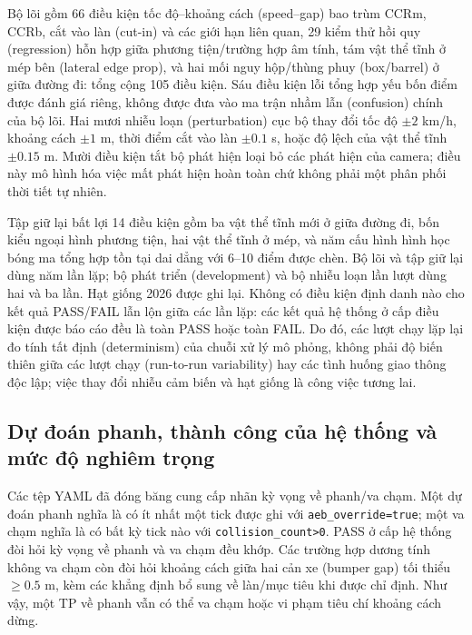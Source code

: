 \documentclass[11pt,a4paper]{article}
\begin{document}
Bộ lõi gồm 66 điều kiện tốc độ--khoảng cách (speed--gap) bao trùm CCRm, CCRb,
cắt vào làn (cut-in) và các giới hạn liên quan, 29 kiểm thử hồi quy
(regression) hỗn hợp giữa phương tiện/trường hợp âm tính, tám vật thể tĩnh ở
mép bên (lateral edge prop), và hai mối nguy hộp/thùng phuy (box/barrel) ở
giữa đường đi: tổng cộng 105 điều kiện. Sáu điều kiện lỗi tổng hợp yếu bốn
điểm được đánh giá riêng, không được đưa vào ma trận nhầm lẫn (confusion)
chính của bộ lõi. Hai mươi nhiễu loạn (perturbation) cục bộ thay đổi tốc độ $\pm2$ km/h,
khoảng cách $\pm1$ m, thời điểm cắt vào làn $\pm0.1$ s, hoặc độ lệch của vật
thể tĩnh $\pm0.15$ m. Mười điều kiện tắt bộ phát hiện loại bỏ các phát hiện
của camera; điều này mô hình hóa việc mất phát hiện hoàn toàn chứ không phải
một phân phối thời tiết tự nhiên.

Tập giữ lại bất lợi 14 điều kiện gồm ba vật thể tĩnh mới ở giữa đường đi, bốn
kiểu ngoại hình phương tiện, hai vật thể tĩnh ở mép, và năm cấu hình hình học
bóng ma tổng hợp tồn tại dai dẳng với 6--10 điểm được chèn. Bộ lõi và tập giữ
lại dùng năm lần lặp; bộ phát triển (development) và bộ nhiễu loạn lần lượt
dùng hai và ba lần. Hạt giống 2026 được ghi lại. Không có điều kiện định danh
nào cho kết quả PASS/FAIL lẫn lộn giữa các lần lặp: các kết quả hệ thống ở cấp
điều kiện được báo cáo đều là toàn PASS hoặc toàn FAIL. Do đó, các lượt chạy
lặp lại đo tính tất định (determinism) của chuỗi xử lý mô phỏng, không phải độ
biến thiên giữa các lượt chạy (run-to-run variability) hay các tình huống giao
thông độc lập; việc thay đổi nhiễu cảm biến và hạt giống là công việc tương
lai.

\subsection{Dự đoán phanh, thành công của hệ thống và mức độ nghiêm trọng}
Các tệp YAML đã đóng băng cung cấp nhãn kỳ vọng về phanh/va chạm. Một dự đoán
phanh nghĩa là có ít nhất một tick được ghi với \texttt{aeb\_override=true};
một va chạm nghĩa là có bất kỳ tick nào với \texttt{collision\_count>0}. PASS
ở cấp hệ thống đòi hỏi kỳ vọng về phanh và va chạm đều khớp. Các trường hợp
dương tính không va chạm còn đòi hỏi khoảng cách giữa hai cản xe (bumper gap)
tối thiểu $\geq0.5$ m, kèm các khẳng định bổ sung về làn/mục tiêu khi được chỉ
định. Như vậy, một TP về phanh vẫn có thể va chạm hoặc vi phạm tiêu chí khoảng
cách dừng.
\end{document}
